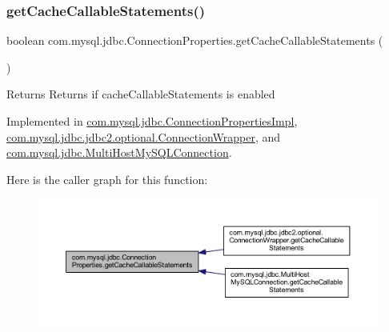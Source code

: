\subsubsection{\texorpdfstring{get\+Cache\+Callable\+Statements()}{getCacheCallableStatements()}}
{\footnotesize\ttfamily boolean com.\+mysql.\+jdbc.\+Connection\+Properties.\+get\+Cache\+Callable\+Statements (\begin{DoxyParamCaption}{ }\end{DoxyParamCaption})}

\begin{DoxyReturn}{Returns}
Returns if cache\+Callable\+Statements is enabled 
\end{DoxyReturn}


Implemented in \mbox{\hyperlink{classcom_1_1mysql_1_1jdbc_1_1_connection_properties_impl_a5e551ecbfcb75e6223467fc28ac3012b}{com.\+mysql.\+jdbc.\+Connection\+Properties\+Impl}}, \mbox{\hyperlink{classcom_1_1mysql_1_1jdbc_1_1jdbc2_1_1optional_1_1_connection_wrapper_abc5b471648eac8eb49a7c16d561de680}{com.\+mysql.\+jdbc.\+jdbc2.\+optional.\+Connection\+Wrapper}}, and \mbox{\hyperlink{classcom_1_1mysql_1_1jdbc_1_1_multi_host_my_s_q_l_connection_a9b0ddb53d65156d1f2866033305d5214}{com.\+mysql.\+jdbc.\+Multi\+Host\+My\+S\+Q\+L\+Connection}}.

Here is the caller graph for this function\+:\nopagebreak
\begin{figure}[H]
\begin{center}
\leavevmode
\includegraphics[width=350pt]{interfacecom_1_1mysql_1_1jdbc_1_1_connection_properties_a24408439f0eeff0fd5181509fa6b68d0_icgraph}
\end{center}
\end{figure}
\mbox{\label{interfacecom_1_1mysql_1_1jdbc_1_1_connection_properties_a74f3ae7b24eeb5ed44da99c60f664ac4}} 
